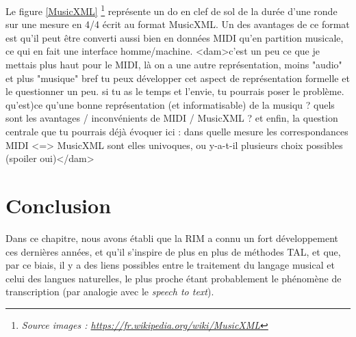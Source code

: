 Le figure \ref{MusicXML}
\footnote{\textit{Source images :
\url{https://fr.wikipedia.org/wiki/MusicXML}}}
représente un do en clef de sol de la durée d’une ronde sur une mesure en 4/4
écrit au format MusicXML.
Un des avantages de ce format est qu’il peut être converti aussi bien en
données MIDI qu’en partition musicale, ce qui en fait une interface
homme/machine.
<dam>c'est un peu ce que je mettais plus haut pour le MIDI, là on a une autre
représentation, moins "audio" et plus "musique" bref tu peux développer cet
aspect de représentation formelle et le questionner un peu.
si tu as le temps et l'envie, tu pourrais poser le problème. qu'est)ce qu'une
bonne représentation (et informatisable) de la musiqu ? quels sont les
avantages / inconvénients de MIDI / MusicXML ?
et enfin, la question centrale que tu pourrais déjà évoquer ici : dans quelle
mesure les correspondances MIDI <=> MusicXML sont elles univoques, ou y-a-t-il
plusieurs choix possibles (spoiler oui)</dam>

\section*{Conclusion}
Dans ce chapitre, nous avons établi que la RIM a connu un fort développement
ces dernières années, et qu'il s'inspire de plus en plus de méthodes TAL, et
que, par ce biais, il y a des liens possibles entre le traitement du langage
musical et celui des langues naturelles, le plus proche étant probablement le
phénomène de transcription (par analogie avec le \textit{speech to text}).
